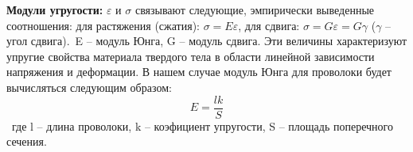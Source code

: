 \documentclass[a4paper,12pt]{article}
\begin{document}
\textbf{Модули угругости:}
\(\varepsilon\) и \(\sigma\) связывают следующие, эмпирически выведенные соотношения:
для растяжения (сжатия): \(\sigma = E\varepsilon\), для сдвига: \(\sigma = G\varepsilon = G\gamma\)   (\(\gamma\) -- угол сдвига).\
E -- модуль Юнга, G -- модуль сдвига. Эти величины характеризуют упругие свойства материала твердого тела в области линейной зависимости напряжения и деформации. В нашем случае модуль Юнга для проволоки будет вычисляться следующим образом: \[E = \frac{lk}{S}\]\
где l -- длина проволоки, k -- коэфициент упругости, S -- площадь поперечного сечения.
\end{document}
